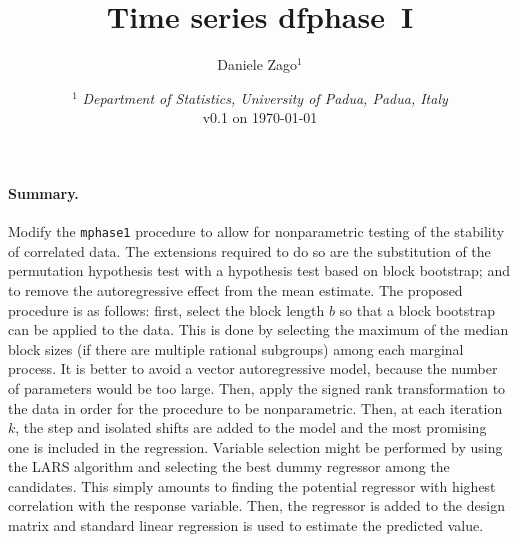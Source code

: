 \documentclass{article}
\author{Daniele Zago$^1$}
\title{Time series dfphase~I}
\date{%
\smaller
$^1$ \textit{Department of Statistics, University of Padua, Padua, Italy}\\%
v0.1 on \today}
\begin{document}
\maketitle

\paragraph{Summary.} Modify the \texttt{mphase1} procedure to allow for nonparametric testing of the stability of correlated data.
The extensions required to do so are the substitution of the permutation hypothesis test with a hypothesis test based on block bootstrap; and to remove the autoregressive effect from the mean estimate.
The proposed procedure is as follows: first, select the block length $ b$ so that a block bootstrap can be applied to the data.
This is done by selecting the maximum of the median block sizes (if there are multiple rational subgroups) among each marginal process.
It is better to avoid a vector autoregressive model, because the number of parameters would be too large.
Then, apply the signed rank transformation to the data in order for the procedure to be nonparametric.
Then, at each iteration $ k$, the step and isolated shifts are added to the model and the most promising one is included in the regression.
Variable selection might be performed by using the LARS algorithm and selecting the best dummy regressor among the candidates.
This simply amounts to finding the potential regressor with highest correlation with the response variable.
Then, the regressor is added to the design matrix and standard linear regression is used to estimate the predicted value.


\printbibliography
\end{document}
